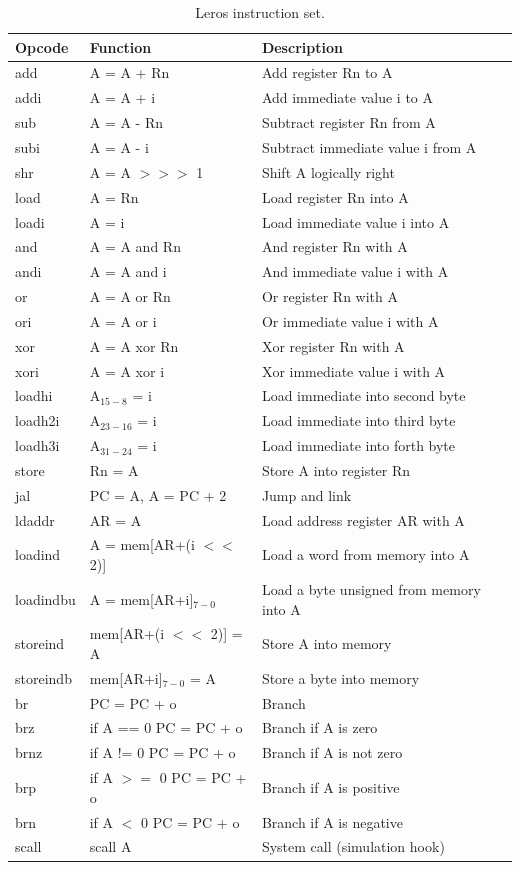 \documentclass[%
    10pt, %
    headinclude, footexclude,
    openright, %
    notitlepage,
    cleardoubleempty,
    headsepline,
    pointlessnumbers,
    bibtotoc, idxtotoc,
    ]{scrbook}
\begin{document}
\begin{table}
\centering
\begin{tabular}{lll}
\toprule
Opcode & Function & Description\\
\midrule
add & A = A + Rn & Add register Rn to A \\
addi & A = A + i & Add immediate value i to A \\
sub & A = A - Rn & Subtract register Rn from A \\
subi & A = A - i & Subtract immediate value i from A \\
shr & A = A $>>>$ 1 & Shift A logically right \\
load & A = Rn & Load register Rn into A \\
loadi & A = i & Load immediate value i into A \\
and & A = A and Rn & And register Rn with A \\
andi & A = A and i & And immediate value i with A \\
or & A = A or Rn & Or register Rn with A \\
ori & A = A or i & Or immediate value i with A \\
xor & A = A xor Rn & Xor register Rn with A \\
xori & A = A xor i & Xor immediate value i with A \\
loadhi & A$_{15-8}$ = i & Load immediate into second byte \\
loadh2i & A$_{23-16}$ = i  & Load immediate into third byte \\
loadh3i & A$_{31-24}$ = i & Load immediate into forth byte \\
store & Rn = A & Store A into register Rn \\
jal & PC = A, A = PC + 2 & Jump and link \\
ldaddr & AR = A & Load address register AR with A \\
loadind & A = mem[AR+(i $<<$ 2)] & Load a word from memory into A \\
loadindbu & A = mem[AR+i]$_{7-0}$  &  Load a byte unsigned from memory into A\\
storeind & mem[AR+(i $<<$ 2)] = A & Store A into memory \\
storeindb & mem[AR+i]$_{7-0}$ = A & Store a byte into memory \\
br & PC = PC + o & Branch \\
brz & if A == 0 PC = PC + o & Branch if A is zero \\
brnz & if A != 0 PC = PC + o  & Branch if A is not zero \\
brp & if A $>=$ 0 PC = PC + o & Branch if A is positive \\
brn & if A $<$ 0 PC = PC + o & Branch if A is negative \\
scall & scall A & System call (simulation hook) \\
\bottomrule
\end{tabular}
\caption{Leros instruction set.}
\label{tab:leros:isa}
\end{table}
\end{document}
